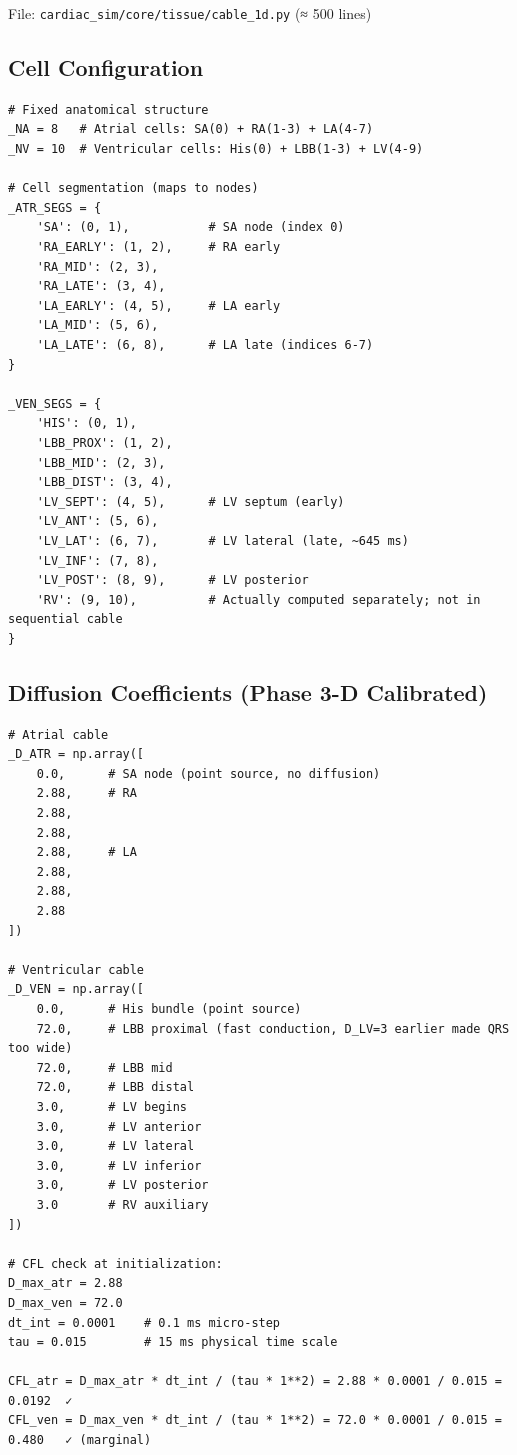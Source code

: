 \documentclass[12pt,a4paper,oneside]{book}
\begin{document}
File: \texttt{cardiac\_sim/core/tissue/cable\_1d.py} (≈ 500 lines)

\subsection{Cell Configuration}

\begin{Verbatim}[formatcom=\color{black}]
# Fixed anatomical structure
_NA = 8   # Atrial cells: SA(0) + RA(1-3) + LA(4-7)
_NV = 10  # Ventricular cells: His(0) + LBB(1-3) + LV(4-9)

# Cell segmentation (maps to nodes)
_ATR_SEGS = {
    'SA': (0, 1),           # SA node (index 0)
    'RA_EARLY': (1, 2),     # RA early
    'RA_MID': (2, 3),
    'RA_LATE': (3, 4),
    'LA_EARLY': (4, 5),     # LA early
    'LA_MID': (5, 6),
    'LA_LATE': (6, 8),      # LA late (indices 6-7)
}

_VEN_SEGS = {
    'HIS': (0, 1),
    'LBB_PROX': (1, 2),
    'LBB_MID': (2, 3),
    'LBB_DIST': (3, 4),
    'LV_SEPT': (4, 5),      # LV septum (early)
    'LV_ANT': (5, 6),
    'LV_LAT': (6, 7),       # LV lateral (late, ~645 ms)
    'LV_INF': (7, 8),
    'LV_POST': (8, 9),      # LV posterior
    'RV': (9, 10),          # Actually computed separately; not in sequential cable
}
\end{Verbatim}

\subsection{Diffusion Coefficients (Phase 3-D Calibrated)}

\begin{Verbatim}[formatcom=\color{black}]
# Atrial cable
_D_ATR = np.array([
    0.0,      # SA node (point source, no diffusion)
    2.88,     # RA
    2.88,
    2.88,
    2.88,     # LA
    2.88,
    2.88,
    2.88
])

# Ventricular cable
_D_VEN = np.array([
    0.0,      # His bundle (point source)
    72.0,     # LBB proximal (fast conduction, D_LV=3 earlier made QRS too wide)
    72.0,     # LBB mid
    72.0,     # LBB distal
    3.0,      # LV begins
    3.0,      # LV anterior
    3.0,      # LV lateral
    3.0,      # LV inferior
    3.0,      # LV posterior
    3.0       # RV auxiliary
])

# CFL check at initialization:
D_max_atr = 2.88
D_max_ven = 72.0
dt_int = 0.0001    # 0.1 ms micro-step
tau = 0.015        # 15 ms physical time scale

CFL_atr = D_max_atr * dt_int / (tau * 1**2) = 2.88 * 0.0001 / 0.015 = 0.0192  ✓
CFL_ven = D_max_ven * dt_int / (tau * 1**2) = 72.0 * 0.0001 / 0.015 = 0.480   ✓ (marginal)
\end{Verbatim}
\end{document}
